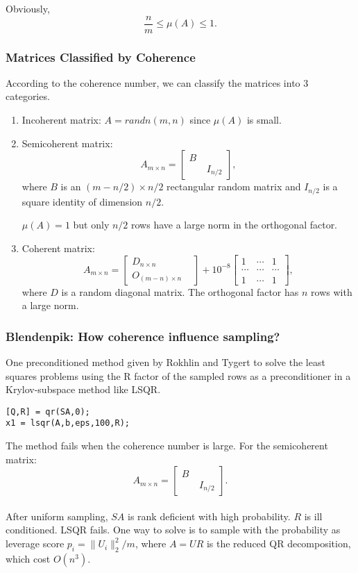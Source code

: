 Obviously,
$$
 \frac{n}{m} \leq \mu(A) \leq 1.
$$

\subsubsection{Matrices Classified by Coherence}
According to the coherence number, we can classify the matrices into 3 categories.
\begin{enumerate}
\item Incoherent matrix: $A = randn(m,n)$ since $\mu(A)$ is small. \\
\item Semicoherent matrix: $$
A_{m \times n} =
 \begin{bmatrix}
  B & \\
    \quad & I_{n/2}
 \end{bmatrix},
$$
where $B$ is an $(m - n/2) \times n/2$ rectangular random matrix and $I_{n/2}$ is a square identity of dimension $n/2$.

$\mu(A) =1$ but only $n/2$ rows have a large norm in the orthogonal factor.
\item Coherent matrix:
$$
A_{m \times n} =  \begin{bmatrix}
  D_{n \times n} & \\
   O_{(m-n) \times n}
 \end{bmatrix}
 + 10^{-8}
 \begin{bmatrix}
1 & \cdots & 1 \\
\cdots & \cdots & \cdots \\
1 & \cdots &1
 \end{bmatrix} ,
$$
where $D$ is a random diagonal matrix. The orthogonal factor has $n$ rows with a large norm.
\end{enumerate}


\subsubsection{Blendenpik: How coherence influence sampling?}
One preconditioned method given by Rokhlin and Tygert to solve the least squares problems using the R factor of the sampled rows as a preconditioner in a Krylov-subspace method like LSQR.
\begin{lstlisting}
[Q,R] = qr(SA,0);
x1 = lsqr(A,b,eps,100,R);
\end{lstlisting}
The method fails when the coherence number is large.
For the semicoherent matrix: $$
A_{m \times n} =
 \begin{bmatrix}
  B & \\
    \quad & I_{n/2}
 \end{bmatrix}.
$$\\
After uniform sampling, $SA$ is rank deficient with high probability. $R$ is ill conditioned. LSQR fails. One way to solve is to sample with the probability as leverage score $p_i = \|U_i\|_2^2/m$, where $A = UR$ is the reduced QR decomposition, which cost $O(n^3).$

